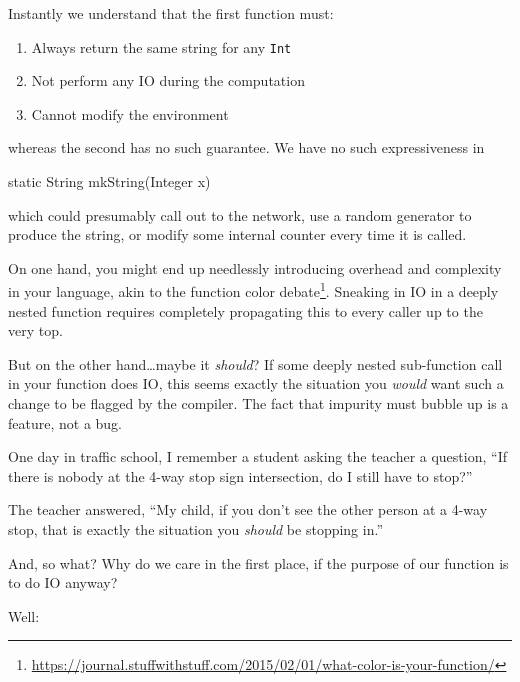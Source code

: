 \documentclass[]{article}
\newenvironment{Shaded}{}{}
\newcommand{\BuiltInTok}[1]{\textcolor[rgb]{0.00,0.50,0.00}{#1}}
\newcommand{\DataTypeTok}[1]{\textcolor[rgb]{0.56,0.13,0.00}{#1}}
\newcommand{\FunctionTok}[1]{\textcolor[rgb]{0.02,0.16,0.49}{#1}}
\newcommand{\NormalTok}[1]{#1}
\newcommand{\OperatorTok}[1]{\textcolor[rgb]{0.40,0.40,0.40}{#1}}
\renewcommand{\href}[2]{#2\footnote{\url{#1}}}
\begin{document}
Instantly we understand that the first function must:

\begin{enumerate}
\def\labelenumi{\arabic{enumi}.}
\tightlist
\item
  Always return the same string for any \texttt{Int}
\item
  Not perform any IO during the computation
\item
  Cannot modify the environment
\end{enumerate}

whereas the second has no such guarantee. We have no such expressiveness in

\begin{Shaded}
\begin{Highlighting}[]
\DataTypeTok{static} \BuiltInTok{String} \FunctionTok{mkString}\OperatorTok{(}\BuiltInTok{Integer}\NormalTok{ x}\OperatorTok{)}
\end{Highlighting}
\end{Shaded}

which could presumably call out to the network, use a random generator to
produce the string, or modify some internal counter every time it is called.

On one hand, you might end up needlessly introducing overhead and complexity in
your language, akin to the
\href{https://journal.stuffwithstuff.com/2015/02/01/what-color-is-your-function/}{function
color debate}. Sneaking in IO in a deeply nested function requires completely
propagating this to every caller up to the very top.

But on the other hand\ldots maybe it \emph{should}? If some deeply nested
sub-function call in your function does IO, this seems exactly the situation you
\emph{would} want such a change to be flagged by the compiler. The fact that
impurity must bubble up is a feature, not a bug.

One day in traffic school, I remember a student asking the teacher a question,
``If there is nobody at the 4-way stop sign intersection, do I still have to
stop?''

The teacher answered, ``My child, if you don't see the other person at a 4-way
stop, that is exactly the situation you \emph{should} be stopping in.''

And, so what? Why do we care in the first place, if the purpose of our function
is to do IO anyway?

Well:
\end{document}
